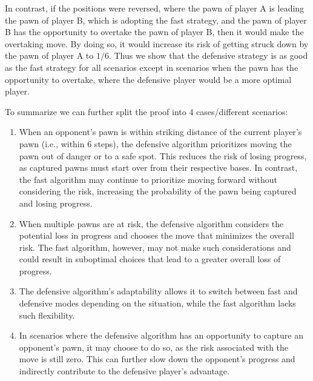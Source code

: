 \documentclass{article} %
\begin{document}
In contrast, if the positions were reversed, where the pawn of player A is leading the pawn of player B, which is adopting the fast strategy, and the pawn of player B has the opportunity to overtake the pawn of player B, then it would make the overtaking move. By doing so, it would increase its risk of getting struck down by the pawn of player A to  $1/6$. Thus we show that the defensive strategy is as good as the fast strategy for all scenarios except in scenarios when the pawn has the opportunity to overtake, where the defensive player would be a more optimal player.

To summarize we can further split the proof into 4 cases/different scenarios:
\begin{enumerate}
    

\item When an opponent's pawn is within striking distance of the current player's pawn (i.e., within $6$ steps), the defensive algorithm prioritizes moving the pawn out of danger or to a safe spot. This reduces the risk of losing progress, as captured pawns must start over from their respective bases. In contrast, the fast algorithm may continue to prioritize moving forward without considering the risk, increasing the probability of the pawn being captured and losing progress.
\item When multiple pawns are at risk, the defensive algorithm considers the potential loss in progress and chooses the move that minimizes the overall risk. The fast algorithm, however, may not make such considerations and could result in suboptimal choices that lead to a greater overall loss of progress.
\item The defensive algorithm's adaptability allows it to switch between fast and defensive modes depending on the situation, while the fast algorithm lacks such flexibility.
\item In scenarios where the defensive algorithm has an opportunity to capture an opponent's pawn, it may choose to do so, as the risk associated with the move is still zero. This can further slow down the opponent's progress and indirectly contribute to the defensive player's advantage.
\end{enumerate}
\end{document}
